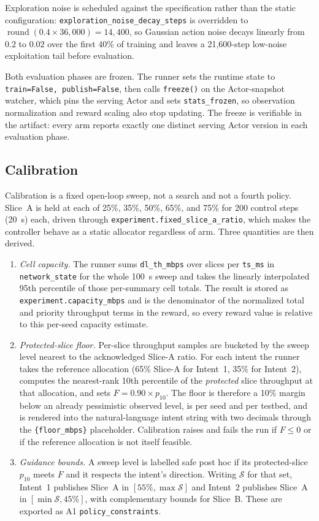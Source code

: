 Exploration noise is scheduled against the specification rather than the static
configuration: \texttt{exploration\_noise\_decay\_steps} is overridden to
$\operatorname{round}(0.4\times36{,}000)=14{,}400$, so Gaussian action noise decays linearly
from $0.2$ to $0.02$ over the first 40\% of training and leaves a 21{,}600-step low-noise
exploitation tail before evaluation.

Both evaluation phases are frozen. The runner sets the runtime state to
\texttt{train=False, publish=False}, then calls \texttt{freeze()} on the Actor-snapshot
watcher, which pins the serving Actor and sets \texttt{stats\_frozen}, so observation
normalization and reward scaling also stop updating. The freeze is verifiable in the artifact:
every arm reports exactly one distinct serving Actor version in each evaluation phase.

\subsection{Calibration}
Calibration is a fixed open-loop sweep, not a search and not a fourth policy. Slice~A is held
at each of 25\%, 35\%, 50\%, 65\%, and 75\% for 200 control steps (20~s) each, driven through
\texttt{experiment.fixed\_slice\_a\_ratio}, which makes the controller behave as a static
allocator regardless of arm. Three quantities are then derived.

\begin{enumerate}
  \item \emph{Cell capacity.} The runner sums \texttt{dl\_th\_mbps} over slices per
  \texttt{ts\_ms} in \texttt{network\_state} for the whole 100~s sweep and takes the
  linearly interpolated 95th percentile of those per-summary cell totals. The result is stored
  as \texttt{experiment.capacity\_mbps} and is the denominator of the normalized total and
  priority throughput terms in the reward, so every reward value is relative to this per-seed
  capacity estimate.
  \item \emph{Protected-slice floor.} Per-slice throughput samples are bucketed by the sweep
  level nearest to the acknowledged Slice-A ratio. For each intent the runner takes the
  reference allocation (65\% Slice-A for Intent~1, 35\% for Intent~2), computes the
  nearest-rank 10th percentile of the \emph{protected} slice throughput at that allocation,
  and sets $F=0.90\times p_{10}$. The floor is therefore a 10\% margin below an already
  pessimistic observed level, is per seed and per testbed, and is rendered into the
  natural-language intent string with two decimals through the \texttt{\{floor\_mbps\}}
  placeholder. Calibration raises and fails the run if $F\le0$ or if the reference allocation
  is not itself feasible.
  \item \emph{Guidance bounds.} A sweep level is labelled safe post hoc if its protected-slice
  $p_{10}$ meets $F$ and it respects the intent's direction. Writing $\mathcal{S}$ for that
  set, Intent~1 publishes Slice~A in $[55\%,\max\mathcal{S}]$ and Intent~2 publishes Slice~A
  in $[\min\mathcal{S},45\%]$, with complementary bounds for Slice~B. These are exported as
  A1 \texttt{policy\_constraints}.
\end{enumerate}

